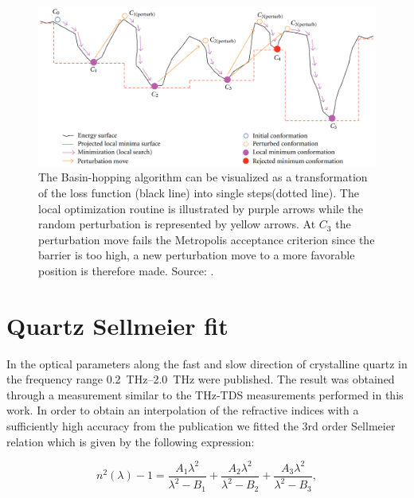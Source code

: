 \begin{figure}[h]
    \centering
    \includegraphics[scale=0.3]{images/7_appendix/bh.png}
    \caption{The Basin-hopping algorithm can be visualized as a transformation of the loss function (black line) into single steps(dotted line). 
    The local optimization routine is illustrated by purple arrows while the random perturbation is represented by yellow arrows. At $C_3$ the perturbation move fails the Metropolis acceptance criterion since the barrier is too high, a new perturbation move to a more favorable position is therefore made. Source: \cite{Olson2012}.}
    \label{fig:Basin-hopping}
\end{figure}

\section{Quartz Sellmeier fit}
\label{sec:sellmeier}
In \cite{DGrischkowsky1990} the optical parameters along the fast and slow direction of crystalline quartz in the frequency range \SIrange{0.2}{2.0}{\tera\hertz} were published. The result was obtained through a measurement similar to the THz-TDS measurements performed in this work. In order to obtain an interpolation of the refractive indices with a sufficiently high accuracy from the publication we fitted the 3rd order Sellmeier relation which is given by the following expression:

\begin{equation}
    \label{eq:sellmeier}
    n^2(\lambda) - 1 = \frac{A_1\lambda^2}{\lambda^2-B_1}+\frac{A_2\lambda^2}{\lambda^2-B_2}+\frac{A_3\lambda^2}{\lambda^2-B_3},
\end{equation}

